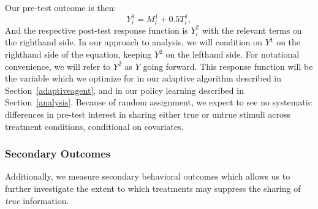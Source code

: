 \documentclass[letterpaper, 12pt, parskip=full,]{scrartcl}
\begin{document}
Our pre-test outcome is then:
\[
Y^1_i = M_i^1 + 0.5 T_i^1,
\]%
And the respective post-test response function is $Y^2_i$ with the relevant terms on the righthand side. In our approach to analysis, we will condition on $Y^1$ on the righthand side of the equation, keeping $Y^2$ on the lefthand side. For notational convenience, we will refer to $Y^2$ as $Y$ going forward. This response function will be the variable which we optimize for in our adaptive algorithm described in Section~\ref{adaptiveagent}, and in our policy learning described in Section~\ref{analysis}. Because of random assignment, we expect to see no systematic differences in pre-test interest in sharing either true or untrue stimuli across treatment conditions, conditional on covariates. %




\subsubsection{Secondary Outcomes}
Additionally, we measure secondary behavioral outcomes which allows us to further investigate the extent to which treatments may suppress the sharing of \textit{true} information.
\end{document}
